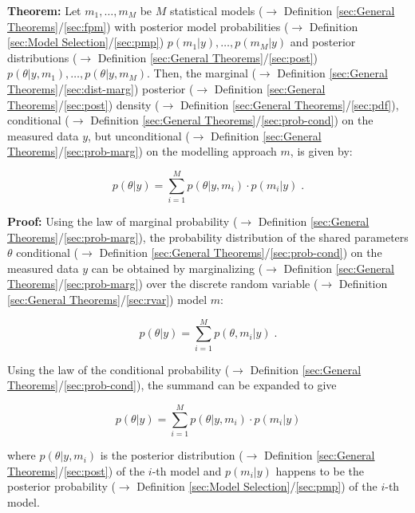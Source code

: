 \documentclass[a4paper,12pt,twoside]{book}
\begin{document}
\textbf{Theorem:} Let $m_1, \ldots, m_M$ be $M$ statistical models ($\rightarrow$ Definition \ref{sec:General Theorems}/\ref{sec:fpm}) with posterior model probabilities ($\rightarrow$ Definition \ref{sec:Model Selection}/\ref{sec:pmp}) $p(m_1 \vert y), \ldots, p(m_M \vert y)$ and posterior distributions ($\rightarrow$ Definition \ref{sec:General Theorems}/\ref{sec:post}) $p(\theta \vert y, m_1), \ldots, p(\theta \vert y, m_M)$. Then, the marginal ($\rightarrow$ Definition \ref{sec:General Theorems}/\ref{sec:dist-marg}) posterior ($\rightarrow$ Definition \ref{sec:General Theorems}/\ref{sec:post}) density ($\rightarrow$ Definition \ref{sec:General Theorems}/\ref{sec:pdf}), conditional ($\rightarrow$ Definition \ref{sec:General Theorems}/\ref{sec:prob-cond}) on the measured data $y$, but unconditional ($\rightarrow$ Definition \ref{sec:General Theorems}/\ref{sec:prob-marg}) on the modelling approach $m$, is given by:

\begin{equation} \label{eq:bma-der-BMA}
p(\theta|y) = \sum_{i=1}^{M} p(\theta|y,m_i) \cdot p(m_i|y) \; .
\end{equation}


\vspace{1em}
\textbf{Proof:} Using the law of marginal probability ($\rightarrow$ Definition \ref{sec:General Theorems}/\ref{sec:prob-marg}), the probability distribution of the shared parameters $\theta$ conditional ($\rightarrow$ Definition \ref{sec:General Theorems}/\ref{sec:prob-cond}) on the measured data $y$ can be obtained by marginalizing ($\rightarrow$ Definition \ref{sec:General Theorems}/\ref{sec:prob-marg}) over the discrete random variable ($\rightarrow$ Definition \ref{sec:General Theorems}/\ref{sec:rvar}) model $m$:

\begin{equation} \label{eq:bma-der-BMA-s1}
p(\theta|y) = \sum_{i=1}^{M} p(\theta,m_i|y) \; .
\end{equation}

Using the law of the conditional probability ($\rightarrow$ Definition \ref{sec:General Theorems}/\ref{sec:prob-cond}), the summand can be expanded to give

\begin{equation} \label{eq:bma-der-BMA-s2}
p(\theta|y) = \sum_{i=1}^{M} p(\theta|y,m_i) \cdot p(m_i|y)
\end{equation}

where $p(\theta \vert y,m_i)$ is the posterior distribution ($\rightarrow$ Definition \ref{sec:General Theorems}/\ref{sec:post}) of the $i$-th model and $p(m_i \vert y)$ happens to be the posterior probability ($\rightarrow$ Definition \ref{sec:Model Selection}/\ref{sec:pmp}) of the $i$-th model.
\end{document}
